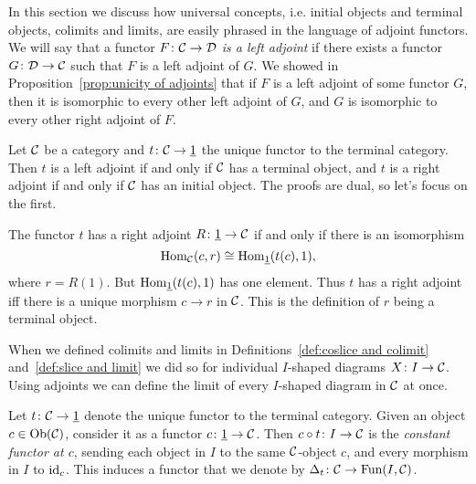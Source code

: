 \documentclass[CT4S-EN-RU]{subfiles}
\begin{document}
\begin{blockENG}
In this section we discuss how universal concepts, i.e. initial objects and terminal objects, colimits and limits, are easily phrased in the language of adjoint functors. We will say that a functor $F\colon\mathcal{C}\rightarrow\mathcal{D}$ {\em is a left adjoint} if there exists a functor $G\colon\mathcal{D}\rightarrow\mathcal{C}$ such that $F$ is a left adjoint of $G$. We showed in Proposition~\ref{prop:unicity of adjoints} that if $F$ is a left adjoint of some functor $G$, then it is isomorphic to every other left adjoint of $G$, and $G$ is isomorphic to every other right adjoint of $F$.
\end{blockENG}

\begin{blockRUS}
\end{blockRUS}

\begin{exampleENG}
Let $\mathcal{C}$ be a category and $t\colon\mathcal{C}\rightarrow\underline{1}$ the unique functor to the terminal category. Then $t$ is a left adjoint if and only if $\mathcal{C}$ has a terminal object, and $t$ is a right adjoint if and only if $\mathcal{C}$ has an initial object. The proofs are dual, so let's focus on the first.

The functor $t$ has a right adjoint $R\colon\underline{1}\rightarrow\mathcal{C}$ if and only if there is an isomorphism $$\textnormal{Hom}_\mathcal{C}(c,r)\cong\textnormal{Hom}_{\underline{1}}(t(c),1),$$ where $r=R(1)$. But $\textnormal{Hom}_{\underline{1}}(t(c),1)$ has one element. Thus $t$ has a right adjoint iff there is a unique morphism $c\to r$ in $\mathcal{C}$. This is the definition of $r$ being a terminal object.
\end{exampleENG}

\begin{exampleRUS}
\end{exampleRUS}

\begin{blockENG}
When we defined colimits and limits in Definitions~\ref{def:coslice and colimit} and~\ref{def:slice and limit} we did so for individual $I$-shaped diagrams $X\colon I\rightarrow\mathcal{C}$. Using adjoints we can define the limit of every $I$-shaped diagram in $\mathcal{C}$ at once.
\end{blockENG}

\begin{blockRUS}
\end{blockRUS}

\begin{blockENG}
Let $t\colon\mathcal{C}\rightarrow\underline{1}$ denote the unique functor to the terminal category. Given an object $c\in\textnormal{Ob}(\mathcal{C})$, consider it as a functor $c\colon\underline{1}\rightarrow\mathcal{C}$. Then $c\circ t\colon I\rightarrow\mathcal{C}$ is the {\em constant functor at $c$}, sending each object in $I$ to the same $\mathcal{C}$-object $c$, and every morphism in $I$ to $\textnormal{id}_c$. This induces a functor that we denote by $\Delta_t\colon\mathcal{C}\rightarrow\textnormal{Fun}(I,\mathcal{C})$.
\end{blockENG}
\end{document}
